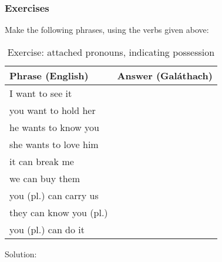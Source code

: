 \newpage
\subsubsection{Exercises}

Make the following phrases, using the verbs given above:
\begin{table}[H]
\centering
\begin{tabular}{|l|M{10.0cm}|}
  \toprule
  \textbf{Phrase (English)} & \textbf{Answer (Gal\'{a}thach)}\\
  \toprule
  I want to see it & \\
  \midrule
  you want to hold her & \\
  \midrule
  he wants to know you & \\
  \midrule
  she wants to love him & \\
  \midrule
  it can break me & \\
  \midrule
  we can buy them & \\
  \midrule
  you (pl.) can carry us & \\
  \midrule
  they can know you (pl.) & \\
  \midrule
  you (pl.) can do it & \\
  \bottomrule
\end{tabular}
\label{exercise_attached_pronouns_indicating_possession}
\caption{Exercise: attached pronouns, indicating possession}
\end{table}

\newpage
Solution:
\begin{table}[H]
\centering
{}
\label{solution_attached_pronouns_indicating_possession}
\caption{Solution: attached pronouns, indicating possession}
\end{table}
